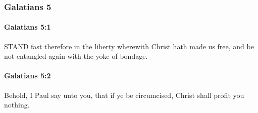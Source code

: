 	\subsubsection{Galatians 5} %
		\label{GALATIANS-5}
		
		\paragraph{Galatians 5:1} %
			\label{GALATIANS-5-1}

			STAND fast therefore in the liberty wherewith Christ hath made us free, and be not entangled again with the yoke of bondage.

			\begin{framed}
			\scriptsize
				\begin{compactdesc}
					\item[SBLG] 
				\end{compactdesc}
			\end{framed}

		\paragraph{Galatians 5:2} %
			\label{GALATIANS-5-2}

			Behold, I Paul say unto you, that if ye be circumcised, Christ shall profit you nothing.

